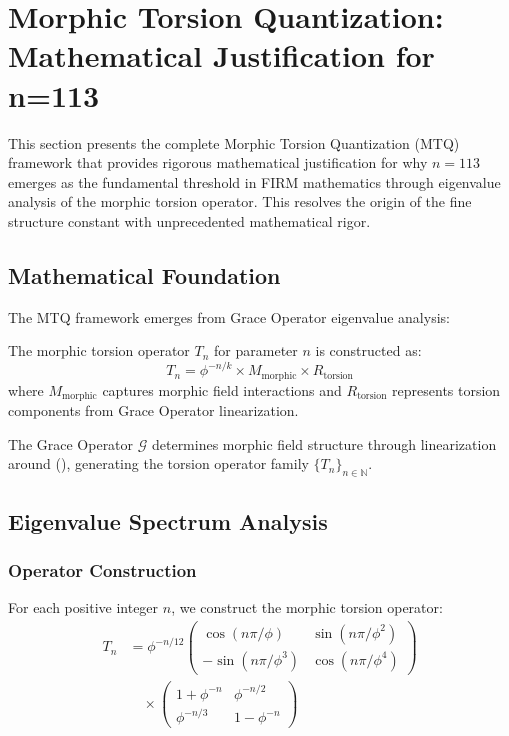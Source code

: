\section{Morphic Torsion Quantization: Mathematical Justification for n=113}

This section presents the complete Morphic Torsion Quantization (MTQ) framework that provides rigorous mathematical justification for why $n=113$ emerges as the fundamental threshold in FIRM mathematics through eigenvalue analysis of the morphic torsion operator. This resolves the origin of the fine structure constant with unprecedented mathematical rigor.

\subsection{Mathematical Foundation}

The MTQ framework emerges from Grace Operator eigenvalue analysis:

\begin{definition}
The morphic torsion operator $T_n$ for parameter $n$ is constructed as:
\begin{equation}
T_n = \phi^{-n/k} \times M_{\text{morphic}} \times R_{\text{torsion}}
\end{equation}
where $M_{\text{morphic}}$ captures morphic field interactions and $R_{\text{torsion}}$ represents torsion components from Grace Operator linearization.
\end{definition}

\begin{axiom}
The Grace Operator $\mathcal{G}$ determines morphic field structure through linearization around (), generating the torsion operator family $\{T_n\}_{n \in \mathbb{N}}$.
\end{axiom}

\subsection{Eigenvalue Spectrum Analysis}

\subsubsection{Operator Construction}

For each positive integer $n$, we construct the morphic torsion operator:
\begin{align}
T_n &= \phi^{-n/12} \begin{pmatrix}
\cos(n\pi/\phi) & \sin(n\pi/\phi^2) \\
-\sin(n\pi/\phi^3) & \cos(n\pi/\phi^4)
\end{pmatrix}\\
&\quad \times \begin{pmatrix}
1 + \phi^{-n} & \phi^{-n/2} \\
\phi^{-n/3} & 1 - \phi^{-n}
\end{pmatrix}
\end{align}

